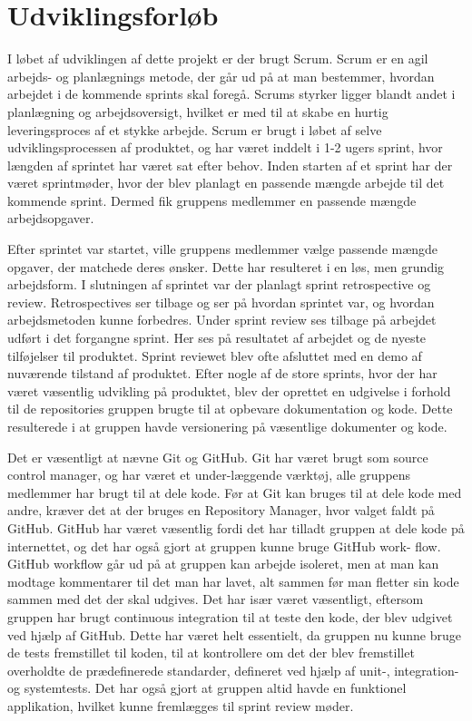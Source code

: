 \chapter{Udviklingsforløb}

I løbet af udviklingen af dette projekt er der brugt Scrum. Scrum er en agil arbejds- og planlægnings metode, der går ud på at man bestemmer, hvordan arbejdet i de kommende sprints skal foregå. Scrums styrker ligger blandt andet i planlægning og arbejdsoversigt, hvilket er med til at skabe en hurtig leveringsproces af et stykke arbejde. Scrum er brugt i løbet af selve udviklingsprocessen af produktet, og har været inddelt i 1-2 ugers sprint, hvor længden af sprintet har været sat efter behov. Inden starten af et sprint har der været sprintmøder, hvor der blev planlagt en passende mængde arbejde til det kommende sprint. Dermed fik gruppens medlemmer en passende mængde arbejdsopgaver.

Efter sprintet var startet, ville gruppens medlemmer vælge passende mængde opgaver, der matchede deres ønsker. Dette har resulteret i en løs, men grundig arbejdsform. I slutningen af sprintet var der planlagt sprint retrospective og review. Retrospectives ser tilbage og ser på hvordan sprintet var, og hvordan arbejdsmetoden kunne forbedres. Under sprint review ses tilbage på arbejdet udført i det forgangne sprint. Her ses på resultatet af arbejdet og de nyeste tilføjelser til produktet. Sprint reviewet blev ofte afsluttet med en demo af nuværende tilstand af produktet. Efter nogle af de store sprints, hvor der har været væsentlig udvikling på produktet, blev der oprettet en udgivelse i forhold til de repositories gruppen brugte til at opbevare dokumentation og kode. Dette resulterede i at gruppen havde versionering på væsentlige dokumenter og kode.

Det er væsentligt at nævne Git og GitHub. Git har været brugt som source control manager, og har været et under-læggende værktøj, alle gruppens medlemmer har brugt til at dele kode. Før at Git kan bruges til at dele kode med andre, kræver det at der bruges en Repository Manager, hvor valget faldt på GitHub. GitHub har været væsentlig fordi det har tilladt gruppen at dele kode på internettet, og det har også gjort at gruppen kunne bruge GitHub work- flow. GitHub workflow går ud på at gruppen kan arbejde isoleret, men at man kan modtage kommentarer til det man har lavet, alt sammen før man fletter sin kode sammen med det der skal udgives. Det har især været væsentligt, eftersom gruppen har brugt continuous integration til at teste den kode, der blev udgivet ved hjælp af GitHub. Dette har været helt essentielt, da gruppen nu kunne bruge de tests fremstillet til koden, til at kontrollere om det der blev fremstillet overholdte de prædefinerede standarder, defineret ved hjælp af unit-, integration- og systemtests. Det har også gjort at gruppen altid havde en funktionel applikation, hvilket kunne fremlægges til sprint review møder.

